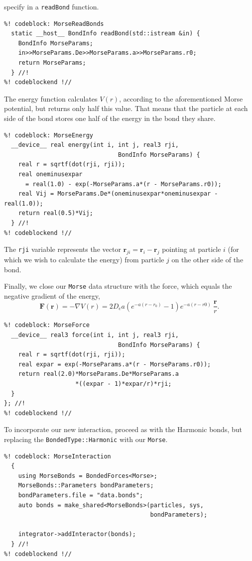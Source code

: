 specify in a \texttt{readBond} function.
\begin{lstlisting}
%! codeblock: MorseReadBonds
  static __host__ BondInfo readBond(std::istream &in) {
    BondInfo MorseParams;
    in>>MorseParams.De>>MorseParams.a>>MorseParams.r0;
    return MorseParams;
  } //!
%! codeblockend !//
\end{lstlisting}
The energy function calculates $V(r)$, according to the aforementioned Morse
potential, but returns only half this value. That means that the particle at
each side of the bond stores one half of the energy in the bond they share.
\begin{lstlisting}
%! codeblock: MorseEnergy
  __device__ real energy(int i, int j, real3 rji,
                                BondInfo MorseParams) {
    real r = sqrtf(dot(rji, rji));
    real oneminusexpar
      = real(1.0) - exp(-MorseParams.a*(r - MorseParams.r0));
    real Vij = MorseParams.De*(oneminusexpar*oneminusexpar - real(1.0));
    return real(0.5)*Vij;
  } //!
%! codeblockend !//
\end{lstlisting}
The \texttt{rji} variable represents the vector
$\mathbf{r}_{ji} = \mathbf{r}_i - \mathbf{r}_j$ pointing at particle $i$ (for
which we wish to calculate the energy) from particle $j$ on the other side of
the bond.

Finally, we close our \texttt{Morse} data structure with the force, which equals
the negative gradient of the energy,
\begin{equation*}
  \mathbf{F}(\mathbf{r})
    = -\nabla V(r)
    = 2 D_e a \left(e^{-a(r - r_0)} - 1\right)
              e^{-a(r - r0)}\ \frac{\mathbf{r}}{r}.
\end{equation*}
\begin{lstlisting}
%! codeblock: MorseForce
  __device__ real3 force(int i, int j, real3 rji,
                                BondInfo MorseParams) {
    real r = sqrtf(dot(rji, rji));
    real expar = exp(-MorseParams.a*(r - MorseParams.r0));
    return real(2.0)*MorseParams.De*MorseParams.a
                    *((expar - 1)*expar/r)*rji;
  }
}; //!
%! codeblockend !//
\end{lstlisting}

To incorporate our new interaction, proceed as with the Harmonic bonds, but
replacing the \texttt{BondedType::Harmonic} with our \texttt{Morse}.
\begin{lstlisting}
%! codeblock: MorseInteraction
  {
    using MorseBonds = BondedForces<Morse>;
    MorseBonds::Parameters bondParameters;
    bondParameters.file = "data.bonds";
    auto bonds = make_shared<MorseBonds>(particles, sys,
                                         bondParameters);

    integrator->addInteractor(bonds);
  } //!
%! codeblockend !//
\end{lstlisting}

